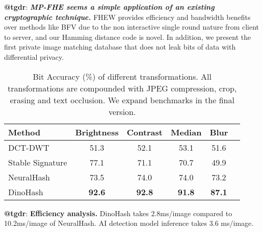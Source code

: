 \documentclass[10pt,twocolumn,letterpaper]{article}
\makeatletter
\newcommand{\rtgdr}{\textcolor{RawSienna}{\bf \textbf{@tgdr}}}
\makeatother
\begin{document}


\noindent \rtgdr: \textbf{\emph{MP-FHE seems a simple application of an existing cryptographic technique.}} 
FHEW provides efficiency and bandwidth benefits over methods like BFV due to the non interactive single round nature from client to server, and our Hamming distance code is novel. In addition, we present the first private image matching database that does not leak bits of data with differential privacy.
\vspace{-10pt}

\begin{table}[!h]
\centering
\scriptsize
\setlength{\tabcolsep}{9pt} %
\begin{tabular}{lccccc}
\toprule
{Method} & {Brightness} & {Contrast} & {Median} & {Blur} \\
\midrule
DCT-DWT  & 51.3 & 52.1 & 53.1 & 51.6 \\ 
Stable Signature & 77.1  & 71.1  & 70.7  & 49.9 \\
NeuralHash & 73.5 & 74.0 & 74.0 & 73.2 \\ 
DinoHash & \textbf{92.6} & \textbf{92.8} & \textbf{91.8} & \textbf{87.1} \\ 


\bottomrule
\end{tabular}


\vspace{-8pt}
\caption{Bit Accuracy (\%) of different transformations. All transformations are compounded with JPEG compression, crop, erasing and text occlusion. We expand benchmarks in the final version.}
\label{tab:bit_acc}
\end{table}
\vspace{-10pt}

\noindent \rtgdr: \textbf{Efficiency analysis.} DinoHash takes 2.8ms/image compared to 10.2ms/image of NeuralHash. AI detection model inference takes 3.6 ms/image.
\end{document}
